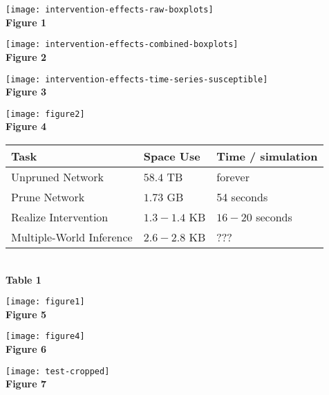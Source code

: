 \documentclass{article}%
\begin{document}
\centering
\begin{minipage}{.45\textwidth}
\texttt{[image: intervention-effects-raw-boxplots]}
\centering
\\\textbf{Figure 1}
\end{minipage}
\begin{minipage}{.45\textwidth}
\texttt{[image: intervention-effects-combined-boxplots]}
\centering
\\\textbf{Figure 2}
\end{minipage}
\begin{minipage}{.6\textwidth}
\texttt{[image: intervention-effects-time-series-susceptible]}
\centering
\\\textbf{Figure 3}
\end{minipage}
\begin{minipage}{.4\textwidth}
\texttt{[image: figure2]}
\centering
\\\textbf{Figure 4}
\end{minipage}
\begin{minipage}{.4\textwidth}
\begin{tabular}{|l|l|l|}
  \hline
  Task & Space Use & Time / simulation\\\hline
  Unpruned Network & $58.4$ TB & forever \\\hline
  Prune Network & $1.73$ GB & 54 seconds \\\hline
  Realize Intervention& $1.3-1.4$ KB & $16-20$ seconds \\\hline
  Multiple-World Inference& $2.6-2.8$ KB & ??? \\\hline
\end{tabular}
\centering
\\\textbf{Table 1}
\end{minipage}
  
\newpage
\begin{minipage}{\textwidth}
\texttt{[image: figure1]}
\centering
\\\textbf{Figure 5}
\end{minipage}
\begin{minipage}{\textwidth}
\texttt{[image: figure4]}
\centering
\\\textbf{Figure 6}
\end{minipage}
\begin{minipage}{\textwidth}
\texttt{[image: test-cropped]}
\centering
\\\textbf{Figure 7}
\end{minipage}
\end{document}
